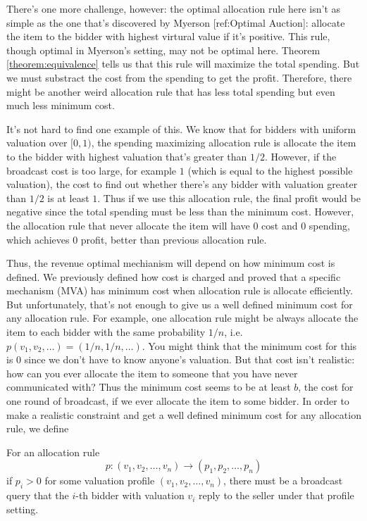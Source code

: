 There's one more challenge, however: the optimal allocation rule here
isn't as simple as the one that's discovered by Myerson [ref:Optimal Auction]:
allocate the item to the bidder with highest virtural value if it's positive.
This rule, though optimal in Myerson's setting, may not be optimal here. Theorem
\ref{theorem:equivalence} tells us that this rule will maximize the total spending.
But we must substract the cost from the spending to get the profit. Therefore,
there might be another weird allocation rule that has less total spending but even
much less minimum cost.

It's not hard to find one example of this. We know that for bidders
with uniform valuation over $[0, 1)$, the spending maximizing allocation rule
is allocate the item to the bidder with highest valuation that's greater than $1/2$.
However, if the broadcast cost is too large, for example $1$ (which is equal to the
highest possible valuation), the cost to find out whether there's any bidder with valuation
greater than $1/2$ is at least $1$. Thus if we use this allocation rule, the
final profit would be negative since the total spending must be less than the
minimum cost. However, the allocation rule that never allocate the item will have
$0$ cost and $0$ spending, which achieves $0$ profit, better than previous allocation
rule.

Thus, the revenue optimal mechianism will depend on how minimum cost is defined. 
We previously defined how cost is charged and proved that a specific mechanism (MVA)
has minimum cost when allocation rule is allocate efficiently. But unfortunately,
that's not enough to give us a well defined minimum cost for any allocation rule.
For example, one allocation rule might be always allocate the item to each bidder
with the same probability $1/n$, i.e. $p(v_1, v_2, \ldots) = (1/n, 1/n, \ldots)$.
You might think that the minimum cost for this is $0$ since we don't have to know
anyone's valuation. But that cost isn't realistic: how can you ever allocate the
item to someone that you have never communicated with? Thus the minimum cost seems
to be at least $b$, the cost for one round of broadcast, if we ever allocate the item
to some bidder. In order to make a realistic constraint and get a well defined minimum
cost for any allocation rule, we define

\begin{definition}\label{def:allocation_cost}
For an allocation rule $$p: (v_1, v_2, \ldots, v_n) \rightarrow (p_1, p_2,
\ldots, p_n)$$ if $p_i > 0$ for some valuation profile $(v_1, v_2, \ldots,
v_n)$, there must be a broadcast query that the $i$-th bidder with valuation
$v_i$ reply to the seller under that profile setting.
\end{definition}

